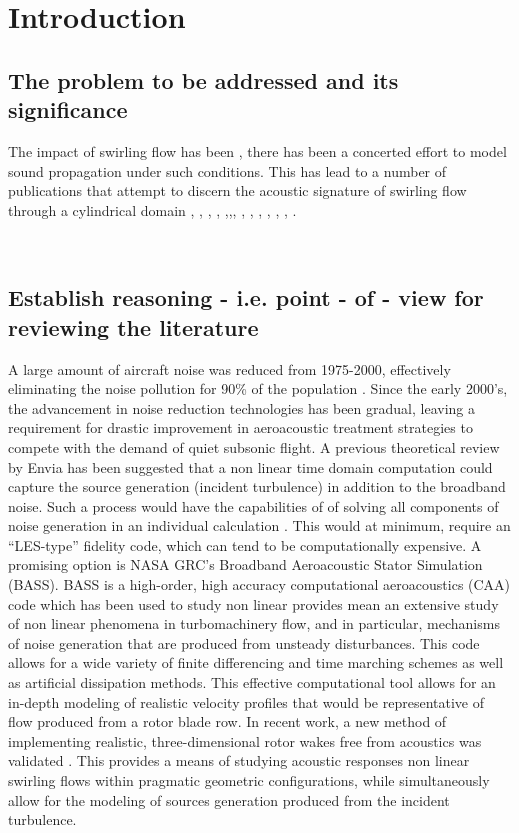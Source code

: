 \section{Introduction}
\subsection{The problem to be addressed and its significance}
The impact of swirling flow has been , there has
been a concerted effort to model sound propagation under such conditions. 
This has lead to a number of publications that attempt to discern the acoustic
signature of swirling flow through a cylindrical domain \cite{Kerrebrock2012} ,
\cite{KERREBROCK1974},  \cite{kousen1996pressure}, 
\cite{kousen1995eigenmode}, \cite{golubev1996sound} ,\cite{Golubev1998},\cite{Golubev1997},
\cite{Tam1998}, \cite{Nijboer2001}, \cite{Guan2009}, \cite{COOPER2001}, 
\cite{Cooper2006}, \cite{Posson2013}, \cite{Heaton2006}. 

\
\subsection{Establish reasoning - i.e. point - of - view for reviewing the literature}


A large amount of aircraft noise was reduced from 1975-2000, 
effectively eliminating the noise pollution for 90\% of the population \cite{FAAPolicy}. 
Since the early 2000's, the advancement in noise reduction technologies has been gradual, 
leaving a requirement for drastic improvement in aeroacoustic treatment 
strategies to compete with the demand of quiet subsonic  flight. 
A previous theoretical review by Envia has been suggested that a non linear 
time domain computation could capture the source generation (incident turbulence) 
in addition to the broadband noise. Such a process would have the capabilities 
of  of solving all components of noise generation in an individual calculation \cite{Envia2004}. 
This would at minimum, require an ``LES-type'' fidelity code, which can tend 
to be computationally expensive.  A promising option is NASA GRC's Broadband 
Aeroacoustic Stator Simulation (BASS).  BASS is a high-order, high 
accuracy computational aeroacoustics (CAA) code which has been used to study 
non linear provides mean an extensive study of non linear phenomena in 
turbomachinery flow, and in particular, mechanisms of noise generation that are 
produced from unsteady disturbances. This code allows for a wide variety of 
finite differencing and time marching schemes as well as artificial dissipation methods. This effective computational tool allows for an in-depth modeling of realistic velocity profiles that would be representative of flow produced from a rotor blade row. In recent work, a new method of implementing realistic, three-dimensional rotor wakes free from acoustics was validated  \cite{Hixon2010}. 
This provides a means of studying acoustic responses non linear swirling flows within pragmatic geometric configurations, while simultaneously allow for the modeling of sources generation produced from the incident turbulence. 

